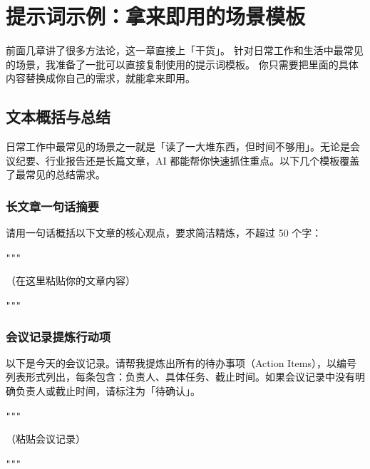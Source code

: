 % 
% 


\chapter{提示词示例：拿来即用的场景模板}
\label{ch:prompt-examples}

前面几章讲了很多方法论，这一章直接上「干货」。
针对日常工作和生活中最常见的场景，我准备了一批可以直接复制使用的提示词模板。
你只需要把里面的具体内容替换成你自己的需求，就能拿来即用。

\section{文本概括与总结}

日常工作中最常见的场景之一就是「读了一大堆东西，但时间不够用」。无论是会议纪要、行业报告还是长篇文章，AI 都能帮你快速抓住重点。以下几个模板覆盖了最常见的总结需求。

\subsection*{长文章一句话摘要}

\begin{promptbox}
请用一句话概括以下文章的核心观点，要求简洁精炼，不超过 50 个字：

\verb|"""|

（在这里粘贴你的文章内容）

\verb|"""|
\end{promptbox}

\subsection*{会议记录提炼行动项}

\begin{promptbox}
以下是今天的会议记录。请帮我提炼出所有的待办事项（Action Items），以编号列表形式列出，每条包含：负责人、具体任务、截止时间。如果会议记录中没有明确负责人或截止时间，请标注为「待确认」。

\verb|"""|

（粘贴会议记录）

\verb|"""|
\end{promptbox}


